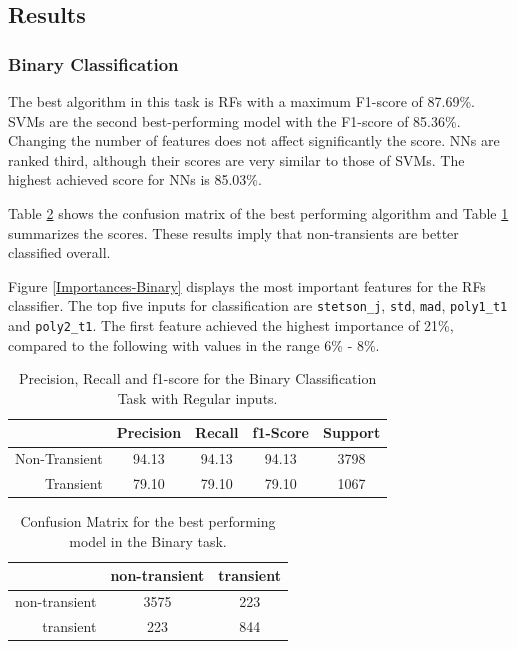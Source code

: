 \documentclass[a4paper,fleqn,usenatbib]{mnras}
\begin{document}
\subsection{Results}

\subsubsection{Binary Classification} 
\label{Results-Binary} 


The best algorithm in this task is RFs with a maximum F1-score of
87.69\%.   
SVMs are the second best-performing model with the F1-score of 85.36\%. 
Changing the number of features does not affect significantly the score.
NNs are ranked third, although their scores are very similar to those of SVMs. 
The highest achieved score for NNs is 85.03\%.


Table \ref{Confusion-Binary} shows the confusion matrix of the best
performing algorithm and Table \ref{Overall-Scores-Binary} summarizes
the scores.
These results imply that non-transients are better classified overall.  


Figure \ref{Importances-Binary} displays the most important features
for the RFs classifier.
The top five inputs for classification are \texttt{stetson\_j},
\texttt{std}, \texttt{mad}, \texttt{poly1\_t1} and \texttt{poly2\_t1}.  
The first feature achieved the highest importance of 21\%, compared to
the following with values in the range 6\% - 8\%.  


\begin{table}
\centering
\begin{tabular}{|r|c|c|c|c|}
\hline
\multicolumn{1}{|l|}{} & Precision & Recall & f1-Score & Support \\ \hline \hline
Non-Transient          & 94.13     & 94.13      & 94.13      & 3798   \\ \hline
Transient              & 79.10     & 79.10      & 79.10      & 1067    \\ \hline
\end{tabular}
\caption{Precision, Recall and f1-score for the Binary Classification Task with Regular inputs.}
\label{Overall-Scores-Binary}
\end{table}

\begin{table}
\centering
\begin{tabular}{|r|c|c|}
\hline
\multicolumn{1}{|l|}{} & non-transient    & transient   \\ \hline \hline
non-transient                & 3575       & 223    \\ \hline
transient                    & 223       & 844   \\ \hline
\end{tabular}
\caption{Confusion Matrix for the best performing model in the Binary task.}
\label{Confusion-Binary}
\end{table}
\end{document}
